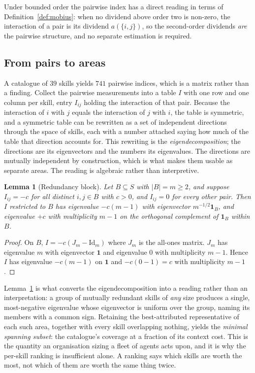 \documentclass[11pt]{article}
\theoremstyle{plain}
\newtheorem{lemma}[theorem]{Lemma}
\theoremstyle{definition}
\theoremstyle{remark}
\begin{document}
Under bounded order the pairwise index has a direct reading in terms of Definition~\ref{def:mobius}: when no dividend above order two is non-zero, the interaction of a pair is its dividend $a(\{i,j\})$, so the second-order dividends \emph{are} the pairwise structure, and no separate estimation is required.

\subsection{From pairs to areas}

A catalogue of $39$ skills yields $741$ pairwise indices, which is a matrix rather than a finding. Collect the pairwise measurements into a table $I$ with one row and one column per skill, entry $I_{ij}$ holding the interaction of that pair. Because the interaction of $i$ with $j$ equals the interaction of $j$ with $i$, the table is symmetric, and a symmetric table can be rewritten as a set of independent directions through the space of skills, each with a number attached saying how much of the table that direction accounts for. This rewriting is the \emph{eigendecomposition}; the directions are its eigenvectors and the numbers its eigenvalues. The directions are mutually independent by construction, which is what makes them usable as separate areas. The reading is algebraic rather than interpretive.

\begin{lemma}[Redundancy block]\label{lem:block}
Let $B \subseteq S$ with $|B| = m \ge 2$, and suppose $I_{ij} = -c$ for all distinct $i,j \in B$ with $c > 0$, and $I_{ij} = 0$ for every other pair. Then $I$ restricted to $B$ has eigenvalue $-c(m-1)$ with eigenvector $m^{-1/2}\mathbf{1}_B$, and eigenvalue $+c$ with multiplicity $m-1$ on the orthogonal complement of $\mathbf{1}_B$ within $B$.
\end{lemma}

\begin{proof}
On $B$, $I = -c(J_m - \mathrm{Id}_m)$ where $J_m$ is the all-ones matrix. $J_m$ has eigenvalue $m$ with eigenvector $\mathbf{1}$ and eigenvalue $0$ with multiplicity $m-1$. Hence $I$ has eigenvalue $-c(m - 1)$ on $\mathbf{1}$ and $-c(0-1) = c$ with multiplicity $m-1$.
\end{proof}

Lemma~\ref{lem:block} is what converts the eigendecomposition into a reading rather than an interpretation: a group of mutually redundant skills of \emph{any} size produces a single, most-negative eigenvalue whose eigenvector is uniform over the group, naming its members with a common sign. Retaining the best-attributed representative of each such area, together with every skill overlapping nothing, yields the \emph{minimal spanning subset}: the catalogue's coverage at a fraction of its context cost. This is the quantity an organisation sizing a fleet of agents acts upon, and it is why the per-skill ranking is insufficient alone. A ranking says which skills are worth the most, not which of them are worth the same thing twice.
\end{document}
